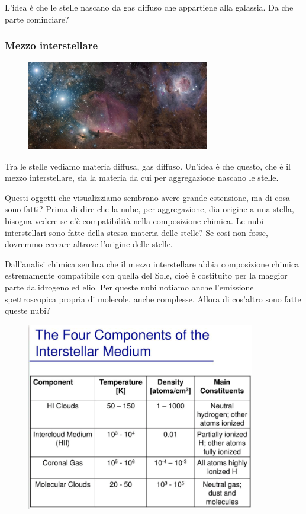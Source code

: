 L'idea è che le stelle nascano da gas diffuso che appartiene alla galassia. Da che parte cominciare?
\subsubsection{Mezzo interstellare}

\begin{figure}[H]
    \centering
    \includegraphics[width=8cm]{lezione 28 novembre/mezzointerstellare.jpg}
    \label{lezione 28 novembre/mezzointerstellare.jpg}
\end{figure}

Tra le stelle vediamo materia diffusa, gas diffuso. Un'idea è che questo, che è il mezzo interstellare, sia la materia da cui per aggregazione nascano le stelle.

Questi oggetti che visualizziamo sembrano avere grande estensione, ma di cosa sono fatti? Prima di dire che la nube, per aggregazione, dia origine a una stella, bisogna vedere se c'è compatibilità nella composizione chimica. Le nubi interstellari sono fatte della stessa materia delle stelle? Se così non fosse, dovremmo cercare altrove l'origine delle stelle.

Dall'analisi chimica sembra che il mezzo interstellare abbia composizione chimica estremamente compatibile con quella del Sole, cioè è costituito per la maggior parte da idrogeno ed elio. Per queste nubi notiamo anche l'emissione spettroscopica propria di molecole, anche complesse. Allora di cos'altro sono fatte queste nubi?
 
\begin{figure}[H]
    \centering
    \includegraphics[width=10cm]{lezione 28 novembre/composizionenubi.png}
    \label{lezione 28 novembre/composizionenubi.png}
\end{figure}

